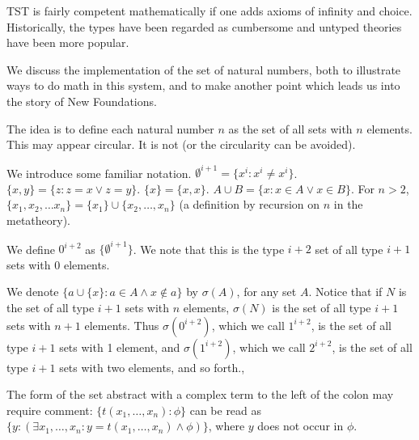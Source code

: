 \documentclass{slides}
\begin{document}
\begin{slide}

TST is fairly competent mathematically if one adds axioms of infinity and choice.  Historically, the types have been regarded as cumbersome and untyped theories have been more popular.

We discuss the implementation of the set of natural numbers, both to illustrate ways to do math in this system, and to make another point which leads us into the story of New Foundations.

The idea is to define each natural number $n$ as the set of all sets with $n$ elements.  This may appear circular.  It is not (or the circularity can be avoided).

\end{slide}

\begin{slide}
We introduce some familiar notation.  $\emptyset^{i+1} = \{x^i:x^i \neq x^i\}$.  $\{x,y\} = \{z:z=x \vee z=y\}$.  $\{x\} = \{x,x\}$.  $A \cup B = \{x :x \in A \vee x \in B\}$.  For $n>2$, $\{x_1,x_2,\ldots x_n\} = \{x_1\} \cup \{x_2,\ldots,x_n\}$ (a definition by recursion on $n$ in the metatheory).

We define $0^{i+2}$ as $\{\emptyset^{i+1}\}$.  We note that this is the type $i+2$ set of all type $i+1$ sets with 0 elements.

We denote $\{a \cup \{x\}:a \in A \wedge x \not\in a\}$ by $\sigma(A)$, for any set $A$.  Notice that if $N$ is the set of all type $i+1$ sets with $n$ elements, $\sigma(N)$ is the set of all type $i+1$ sets with $n+1$ elements.  Thus $\sigma(0^{i+2})$, which we call $1^{i+2}$, is the set of all type $i+1$ sets with 1 element, and $\sigma(1^{i+2})$, which we call $2^{i+2}$, is the set of all type $i+1$ sets with two elements, and so forth.,

The form of the set abstract with a complex term to the left of the colon may require comment:  $\{t(x_1,\ldots,x_n):\phi\}$ can be read as $\{y:(\exists x_1,\ldots,x_n:y = t(x_1,\ldots,x_n) \wedge \phi)\}$, where $y$ does not occur in $\phi$.

\end{slide}
\end{document}
